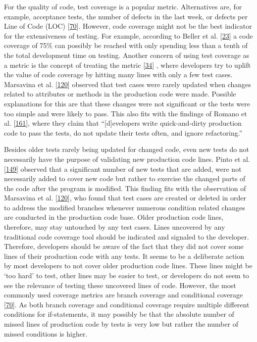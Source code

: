 \documentclass[]{book}
\begin{document}
For the quality of code, test coverage is a popular metric. Alternatives
are, for example, acceptance tests, the number of defects in the last
week, or defects per Line of Code (LOC)
{[}\protect\hyperlink{ref-GAROUSI20131354}{70}{]}. However, code
coverage might not be the best indicator for the extensiveness of
testing. For example, according to Beller et al.
{[}\protect\hyperlink{ref-Beller:2015:DT:2819009.2819101}{23}{]} a code
coverage of 75\% can possibly be reached with only spending less than a
tenth of the total development time on testing. Another concern of using
test coverage as a metric is the concept of treating the metric
{[}\protect\hyperlink{ref-bouwers2012a}{34}{]} , where developers try to
uplift the value of code coverage by hitting many lines with only a few
test cases. Marsavina et al.
{[}\protect\hyperlink{ref-marsavina2014}{120}{]} observed that test
cases were rarely updated when changes related to attributes or methods
in the production code were made. Possible explanations for this are
that these changes were not significant or the tests were too simple and
were likely to pass. This also fits with the findings of Romano et al.
{[}\protect\hyperlink{ref-ROMANO201764}{161}{]}, where they claim that
``{[}d{]}evelopers write quick-and-dirty production code to pass the
tests, do not update their tests often, and ignore refactoring.''

Besides older tests rarely being updated for changed code, even new
tests do not necessarily have the purpose of validating new production
code lines. Pinto et al.
{[}\protect\hyperlink{ref-pinto2012understanding}{149}{]} observed that
a significant number of new tests that are added, were not necessarily
added to cover new code but rather to exercise the changed parts of the
code after the program is modified. This finding fits with the
observation of Marsavina et al.
{[}\protect\hyperlink{ref-marsavina2014}{120}{]}, who found that test
cases are created or deleted in order to address the modified branches
whenever numerous condition related changes are conducted in the
production code base. Older production code lines, therefore, may stay
untouched by any test cases. Lines uncovered by any traditional code
coverage tool should be indicated and signaled to the developer.
Therefore, developers should be aware of the fact that they did not
cover some lines of their production code with any tests. It seems to be
a deliberate action by most developers to not cover older production
code lines. These lines might be `too hard' to test, other lines may be
easier to test, or developers do not seem to see the relevance of
testing these uncovered lines of code. However, the most commonly used
coverage metrics are branch coverage and conditional coverage
{[}\protect\hyperlink{ref-GAROUSI20131354}{70}{]}. As both branch
coverage and conditional coverage require multiple different conditions
for if-statements, it may possibly be that the absolute number of missed
lines of production code by tests is very low but rather the number of
missed conditions is higher.
\end{document}
